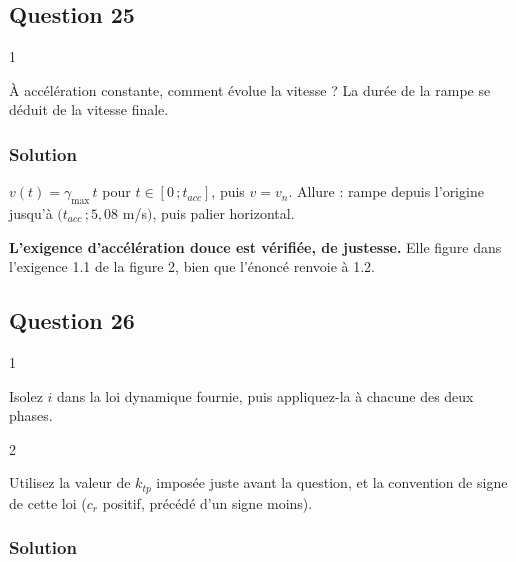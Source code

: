 \documentclass[11pt,a4paper]{article}
\newcommand{\equationajustee}[1]{%
  \sbox{\boiteequation}{$\displaystyle #1$}%
  \ifdim\wd\boiteequation>\linewidth
    \[\resizebox{\linewidth}{!}{\usebox{\boiteequation}}\]%
  \else
    \[#1\]%
  \fi}
\begin{document}
\hypertarget{question-25}{%
\subsection{Question 25}\label{question-25}}

\begin{indication}{1}

À accélération constante, comment évolue la vitesse ? La durée de la rampe se déduit de la vitesse finale.

\end{indication}

\hypertarget{solution-24}{%
\subsubsection{Solution}\label{solution-24}}

\(v(t)=\gamma_{\max}\,t\) pour \(t\in[0\,;t_{acc}]\), puis \(v=v_n\). Allure : rampe depuis l'origine jusqu'à \((t_{acc}\,;5{,}08\) m/s\()\), puis palier horizontal.

\equationajustee{\boxed{t_{acc}=\frac{v_n}{\gamma_{\max}}=10{,}16\ \text{s}}>10\ \text{s}.}

\textbf{L'exigence d'accélération douce est vérifiée, de justesse.} Elle figure dans l'exigence 1.1 de la figure 2, bien que l'énoncé renvoie à 1.2.

\hypertarget{question-26}{%
\subsection{Question 26}\label{question-26}}

\begin{indication}{1}

Isolez \(i\) dans la loi dynamique fournie, puis appliquez-la à chacune des deux phases.

\end{indication}

\begin{indication}{2}

Utilisez la valeur de \(k_{tp}\) imposée juste avant la question, et la convention de signe de cette loi (\(c_r\) positif, précédé d'un signe moins).

\end{indication}

\hypertarget{solution-25}{%
\subsubsection{Solution}\label{solution-25}}
\end{document}

